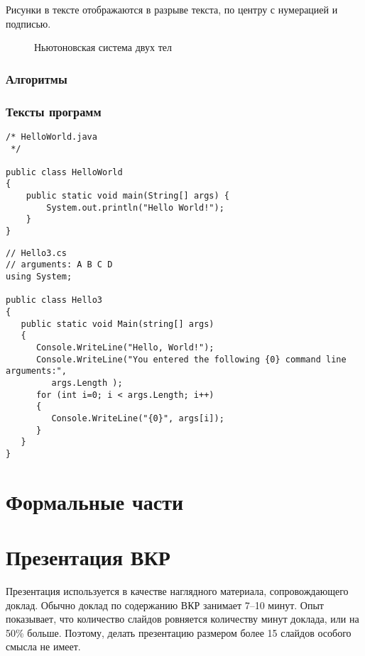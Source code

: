 \documentclass[a4paper,14pt,final]{extreport}
\begin{document}
Рисунки в тексте отображаются в разрыве текста, по центру с нумерацией и подписью.
\begin{figure}[bh]
  \centering
  \def\svgwidth{0.8\linewidth}
  


  \caption{Ньютоновская система двух тел}
  \label{fig:bodies}
\end{figure}


\subsection{Алгоритмы}
\label{sec:algs}

\subsection{Тексты программ}
\label{sec:sources}

\begin{verbatim}
/* HelloWorld.java
 */

public class HelloWorld
{
	public static void main(String[] args) {
		System.out.println("Hello World!");
	}
}
\end{verbatim}

\begin{verbatim}
// Hello3.cs
// arguments: A B C D
using System;

public class Hello3
{
   public static void Main(string[] args)
   {
      Console.WriteLine("Hello, World!");
      Console.WriteLine("You entered the following {0} command line arguments:",
         args.Length );
      for (int i=0; i < args.Length; i++)
      {
         Console.WriteLine("{0}", args[i]);
      }
   }
}
\end{verbatim}

\chapter{Формальные части}
\label{cha:formal}

\chapter{Презентация ВКР}
\label{cha:presentation}

Презентация используется в качестве наглядного материала, сопровождающего доклад.  Обычно доклад по содержанию ВКР занимает 7--10 минут.  Опыт показывает, что количество слайдов ровняется количеству минут доклада, или на 50\% больше.  Поэтому, делать презентацию размером более 15 слайдов особого смысла не имеет.
\end{document}
